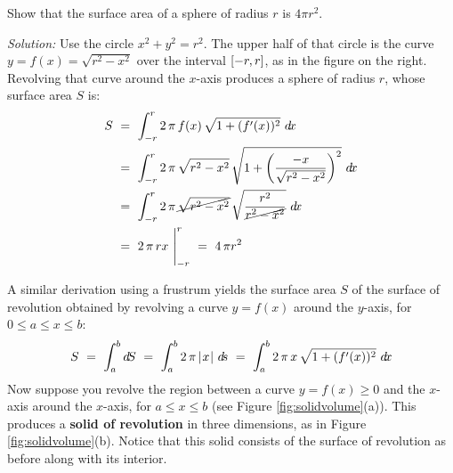 \begin{exmp}
\noindent Show that the surface area of a sphere of radius $r$ is
$4\pi r^2$.\vspace{1mm}
\par\noindent\emph{Solution:} Use the circle $x^2+y^2=r^2$. The upper half of
that circle is the curve $y=f(x)=\sqrt{r^2-x^2}$ over the
interval $\lbrack -r,r \rbrack$, as in the figure on the right. Revolving that curve
around the $x$-axis produces a sphere of radius $r$, whose surface area $S$ is:
\begin{align*}
S ~&=~ \int_{-r}^r 2\,\pi\,f(x)\,\sqrt{1 + (f'(x))^2}~d\!x\\
&=~ \int_{-r}^r 2\,\pi\,\sqrt{r^2-x^2}\,\sqrt{1 + \left(\frac{-x}{\sqrt{r^2-x^2}}\right)^2}~d\!x\\
&=~ \int_{-r}^r 2\,\pi\,\cancel{\sqrt{r^2-x^2}}\,\sqrt{\frac{r^2}{\cancel{r^2-x^2}}}~d\!x\\
&=~ 2\,\pi\,rx~\Biggr|_{-r}^r ~=~ 4\,\pi r^2 \quad\relax
\end{align*}
\end{exmp}
\divider
\vspace{2mm}

A similar derivation using a frustrum yields the surface area $S$ of the surface
of revolution obtained by revolving a curve $y=f(x)$ around the $y$-axis, for
$0\le a\le x\le b$:
\begin{equation}\label{eqn:surfareageny}
S ~=~ \int_a^b d\!S ~=~ \int_a^b 2\,\pi\,\lvert\mspace{1mu}x\mspace{1mu}\rvert~d\!s ~=~
\int_a^b 2\,\pi\,x\,\sqrt{1 + (f'(x))^2}~d\!x
\end{equation}
\newpage
Now suppose you revolve the region between a curve $y=f(x)\ge 0$ and the
$x$-axis around the $x$-axis, for $a\le x\le b$ (see Figure
\ref{fig:solidvolume}(a)). This produces a \textbf{solid of revolution}
in three dimensions, as in Figure
\ref{fig:solidvolume}(b). Notice that this solid
consists of the surface of revolution as before along with its interior. 

